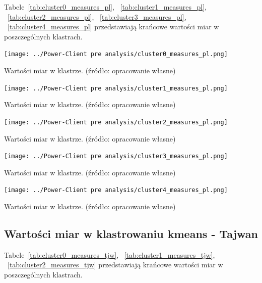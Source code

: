 \documentclass[11pt]{report}
\begin{document}
    Tabele~\ref{tab:cluster0_measures_pl},
    ~\ref{tab:cluster1_measures_pl},
    ~\ref{tab:cluster2_measures_pl},
    ~\ref{tab:cluster3_measures_pl},
    ~\ref{tab:cluster4_measures_pl}
    przedstawiają krańcowe wartości miar w poszczególnych klastrach.

    \begin{table}[!htp]
        \centering
        \texttt{[image: ../Power-Client pre analysis/cluster0\_measures\_pl.png]}
        \caption{Wartości miar w klastrze. (źródło: opracowanie własne)}
        \label{tab:cluster0_measures_pl}
    \end{table}
    \begin{table}[!htp]
        \centering
        \texttt{[image: ../Power-Client pre analysis/cluster1\_measures\_pl.png]}
        \caption{Wartości miar w klastrze. (źródło: opracowanie własne)}
        \label{tab:cluster1_measures_pl}
    \end{table}
    \begin{table}[!htp]
        \centering
        \texttt{[image: ../Power-Client pre analysis/cluster2\_measures\_pl.png]}
        \caption{Wartości miar w klastrze. (źródło: opracowanie własne)}
        \label{tab:cluster2_measures_pl}
    \end{table}
    \begin{table}[!htp]
        \centering
        \texttt{[image: ../Power-Client pre analysis/cluster3\_measures\_pl.png]}
        \caption{Wartości miar w klastrze. (źródło: opracowanie własne)}
        \label{tab:cluster3_measures_pl}
    \end{table}
    \begin{table}[!htp]
        \centering
        \texttt{[image: ../Power-Client pre analysis/cluster4\_measures\_pl.png]}
        \caption{Wartości miar w klastrze. (źródło: opracowanie własne)}
        \label{tab:cluster4_measures_pl}
    \end{table}

    \subsection{Wartości miar w klastrowaniu kmeans - Tajwan}\label{subsec:wartości-miar-w-klastrowaniu-kmeans---tajwan}

    Tabele~\ref{tab:cluster0_measures_tjw},
    ~\ref{tab:cluster1_measures_tjw},
    ~\ref{tab:cluster2_measures_tjw}
    przedstawiają krańcowe wartości miar w poszczególnych klastrach.
\end{document}
